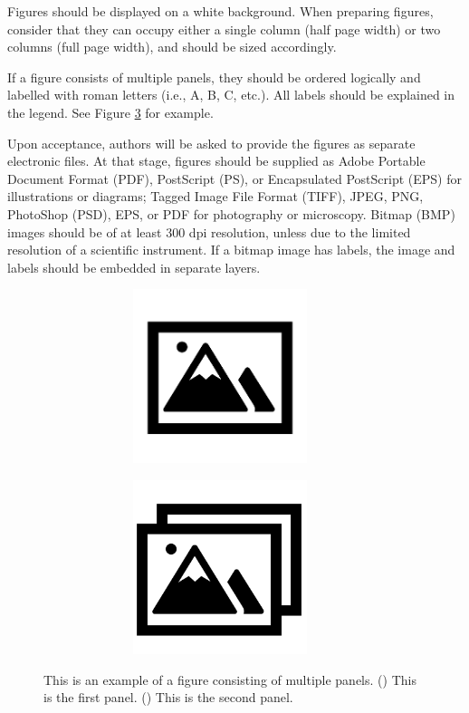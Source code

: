 \documentclass{article}
\begin{document}
Figures should be displayed on a white background. When preparing figures, consider that they can occupy either a single column (half page width) or two columns (full page width), and should be sized accordingly.

If a figure consists of multiple panels, they should be ordered logically and labelled with roman letters (i.e., A, B, C, etc.). All labels should be explained in the legend. See Figure \ref{fig:2} for example.

Upon acceptance, authors will be asked to provide the figures as separate electronic files. At that stage, figures should be supplied as Adobe Portable Document Format (PDF), PostScript (PS), or Encapsulated PostScript (EPS) for illustrations or diagrams; Tagged Image File Format (TIFF), JPEG, PNG, PhotoShop (PSD), EPS, or PDF for photography or microscopy. Bitmap (BMP) images should be of at least 300 dpi resolution, unless due to the limited resolution of a scientific instrument. If a bitmap image has labels, the image and labels should be embedded in separate layers.

\begin{figure}[h]
    \centering
    \begin{subfigure}{0.4\textwidth}
        \includegraphics[width=0.9\textwidth, height=2in]{./img/fig 1}
        \caption{\label{fig:2a}}
    \end{subfigure}
    \begin{subfigure}{0.4\textwidth}
        \includegraphics[width=0.9\textwidth, height=2in]{./img/fig 2}
        \caption{\label{fig:2b}}
    \end{subfigure}
    \caption{This is an example of a figure consisting of multiple panels.     () This is the first panel. () This is the second panel.}
    \label{fig:2}
\end{figure}
\end{document}
